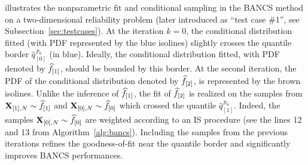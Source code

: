  illustrates the nonparametric fit and conditional sampling in the BANCS method on a two-dimensional reliability problem (later introduced as ``test case \#1'', see Subsection~\ref{sec:testcases}). 
At the iteration $k=0$, the conditional distribution fitted (with PDF represented by the blue isolines) slightly crosses the quantile border $\widehat{q}_{[0]}^{\, p_0}$ (in blue). 
Ideally, the conditional distribution fitted, with PDF denoted by $\widehat{f}_{[1]}$, should be bounded by this border. 
At the second iteration, the PDF of the conditional distribution denoted by $\widehat{f}_{[2]}$, is represented by the brown isolines. 
Unlike the inference of $\widehat{f}_{[1]}$, the fit of $\widehat{f}_{[2]}$ is realized on the samples from ${\bf X}_{[1], N} \sim \widehat{f}_{[1]}$ and ${\bf X}_{[0], N} \sim \widehat{f}_{[0]}$ which crossed the quantile $\widehat{q}_{[1]}^{\, p_0}$. 
Indeed, the samples ${\bf X}_{[0], N} \sim \widehat{f}_{[0]}$ are weighted according to an IS procedure (see the lines 12 and 13 from Algorithm~\ref{alg:bancs}). 
Including the samples from the previous iterations refines the goodness-of-fit near the quantile border and significantly improves BANCS performances. 

